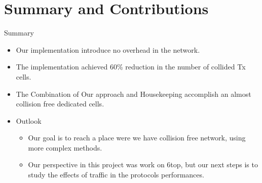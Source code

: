 \section{Summary and Contributions}
\begin{withoutheadline}
\begin{frame}{Summary}
  \begin{itemize}
  \item
    Our implementation introduce  \alert{no overhead } in the network.
  \item
    The implementation \alert{achieved 60\% reduction} in the number of collided Tx cells.
  \item The Combination of Our approach and Housekeeping accomplish an \alert{ almost collision free dedicated cells}.
  \end{itemize}
  
  \begin{itemize}
  \item
    Outlook
    \begin{itemize}
    \item
     Our goal is to reach a place were we have collision free network, using more complex methods.
    \item
      Our perspective in this project was work on 6top, but our next steps is to study the effects of traffic in the protocols performances.
    \end{itemize}
  \end{itemize}
\end{frame}
\end{withoutheadline}